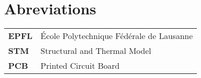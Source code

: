 \section*{Abreviations}

\begin{table}[htbp]
    \begin{tabular}{>{\bfseries}l l}
    EPFL & École Polytechnique Fédérale de Lausanne\\
    STM  & Structural and Thermal Model\\
    PCB  & Printed Circuit Board\\
    \end{tabular}%
\end{table}%